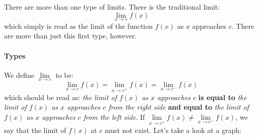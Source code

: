 \documentclass[../revisedMain.tex]{subfiles}
\begin{document}
	\par 	There are more than one type of limits. There is the traditional limit: $$\lim_{x\to c} f(x)$$ which simply is read as the limit of the function $f(x)$ as $x$ approaches $c$. There are more than just this first type, however.
	\paragraph{Types} We define $\lim\limits_{x\to c}$ to be:$$\lim_{x\to c} f(x) = \lim_{x\to c^+} f(x) =\lim_{x\to c^-} f(x)$$ which should be read as: \textit{the limit of $f(x)$ as $x$ approaches $c$} \textbf{is equal to} \textit{the limit of $f(x)$ as $x$ approaches $c$ from the right side} \textbf{and equal to} \textit{the limit of $f(x)$ as $x$ approaches $c$ from the left side}. If $\lim\limits_{x\to c^+} f(x) \neq\lim\limits_{x\to c^-} f(x)$, we say that the limit of $f(x)$ at $c$ must not exist. Let's take a look at a graph:
	\begin{center}
	\end{center} 
\end{document}
